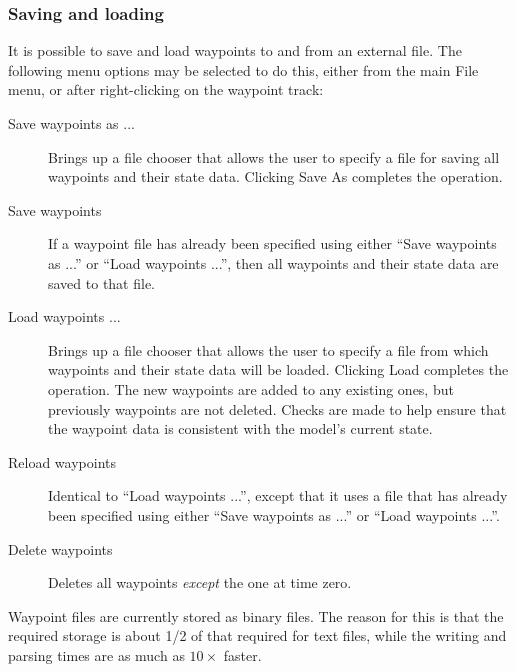 \documentclass{article}
\begin{document}
\subsubsection{Saving and loading}
\label{SavingLoadingWaypoints:sec}

It is possible to save and load waypoints to and from an external
file. The following menu options may be selected to do this, either
from the main {\sf File} menu, or after right-clicking on the waypoint
track:

\begin{description}

\item[Save waypoints as ...] \mbox{}

Brings up a file chooser that allows the user to specify a file for
saving all waypoints and their state data. Clicking {\sf Save As}
completes the operation.

\item[Save waypoints] \mbox{}

If a waypoint file has already been specified using either {\sf ``Save
waypoints as ...''} or {\sf ``Load waypoints ...''}, then all waypoints and
their state data are saved to that file.

\item[Load waypoints ...] \mbox{}

Brings up a file chooser that allows the user to specify a file from
which waypoints and their state data will be loaded. Clicking {\sf
Load} completes the operation.  The new waypoints are added to
any existing ones, but previously waypoints are not deleted. Checks
are made to help ensure that the waypoint data is consistent with the
model's current state.

\item[Reload waypoints] \mbox{}

Identical to {\sf ``Load waypoints ...''}, except that it uses a file that
has already been specified using either {\sf ``Save waypoints as ...''} or
{\sf ``Load waypoints ...''}.

\item[Delete waypoints] \mbox{}

Deletes all waypoints {\it except} the one at time zero.

\end{description}

\begin{sideblock}
Waypoint files are currently stored as binary files. The reason for
this is that the required storage is about 1/2 of that required for
text files, while the writing and parsing times are as much as
$10 \times$ faster.
\end{sideblock}
\end{document}
